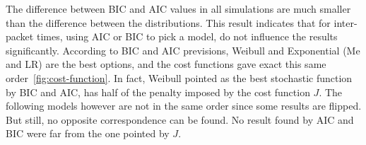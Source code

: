 The difference between BIC and AIC values in all simulations are much smaller than the difference between the distributions. This result indicates that for inter-packet times, using AIC or BIC to pick a model, do not influence the results significantly. According to BIC and AIC previsions, Weibull and Exponential (Me and LR) are the best options, and the cost functions gave exact this same order~\ref{fig:cost-function}. In fact, Weibull pointed as the best stochastic function by BIC and AIC, has half of the penalty imposed by the cost function $J$. The following models however are not in the same order since some results are flipped. But still, no opposite correspondence can be found. No result found by AIC and BIC were far from the one pointed by $J$. 
















